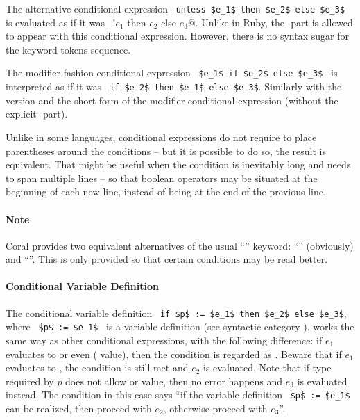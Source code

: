 The alternative conditional expression ~\lstinline!unless $e_1$ then $e_2$ else $e_3$!~ is evaluated as if it was ~\lstinline@if !$e_1$ then $e_2$ else $e_3$@. Unlike in Ruby, the -part is allowed to appear with this conditional expression. However, there is no syntax sugar for the  keyword tokens sequence. 

The modifier-fashion conditional expression ~\lstinline!$e_1$ if $e_2$ else $e_3$!~ is interpreted as if it was ~\lstinline!if $e_2$ then $e_1$ else $e_3$!. Similarly with the  version and the short form of the modifier conditional expression (without the explicit -part). 

Unlike in some languages, conditional expressions do not require to place parentheses around the conditions -- but it is possible to do so, the result is equivalent. That might be useful when the condition is inevitably long and needs to span multiple lines -- so that boolean operators may be situated at the beginning of each new line, instead of being at the end of the previous line. 

\paragraph{Note}
Coral provides two equivalent alternatives of the usual ``'' keyword: ``'' (obviously) and ``''. This is only provided so that certain conditions may be read better.

\paragraph{Conditional Variable Definition}
The conditional variable definition ~\lstinline!if $p$ := $e_1$ then $e_2$ else $e_3$!, where ~\lstinline!$p$ := $e_1$!~ is a variable definition (see syntactic category ), works the same way as other conditional expressions, with the following difference: if $e_1$ evaluates to  or even \code{()} ( value), then the condition is regarded as . Beware that if $e_1$ evaluates to , the condition is still met and $e_2$ is evaluated. Note that if type required by $p$ does not allow  or \code{()} value, then no error happens and $e_3$ is evaluated instead. The condition in this case says ``if the variable definition ~\lstinline!$p$ := $e_1$!~ can be realized, then proceed with $e_2$, otherwise proceed with $e_3$''. 






